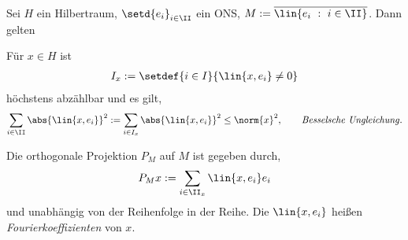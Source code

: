 \begin{prop}
\label{prop:5.21}
Sei $H$ ein Hilbertraum, $\setd{e_i}_{i\in\II}$ ein ONS,
$M:=\overline{\lin{e_i\ :\ i\in \II}}$. Dann gelten
\begin{propenum}
  \item Für $x\in H$ ist
\begin{align*}
I_x := \setdef{i\in I}{\lin{x,e_i}\neq0} 
\end{align*}
höchstens abzählbar und es gilt,
\begin{align*}
\sum\limits_{i\in\II} \abs{\lin{x,e_i}}^2 := \sum\limits_{i\in I_x}
\abs{\lin{x,e_i}}^2 \le \norm{x}^2,\qquad\text{\emph{Besselsche Ungleichung}}.
\end{align*}
\item Die orthogonale Projektion $P_M$ auf $M$ ist
gegeben durch,
\begin{align*}
P_M x := \sum\limits_{i\in\II_x} \lin{x,e_i}e_i
\end{align*}
und unabhängig von der Reihenfolge in der Reihe. Die $\lin{x,e_i}$ heißen
\emph{Fourierkoeffizienten} von $x$.\fishhere
\end{propenum}
\end{prop}
